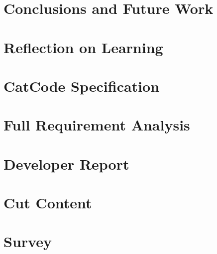 \chapter{Conclusions and Future Work}\label{ch7:conclusions}


\chapter{Reflection on Learning}\label{ch8:reflections}


\backmatter

\appendix
\chapter{CatCode Specification}\label{app:supp}


\chapter{Full Requirement Analysis}\label{app:fullReqAnalysis}


\chapter{Developer Report}\label{app:developerReport}


\chapter{Cut Content}\label{app:cutContent}


\chapter{Survey}\label{app:survey}




